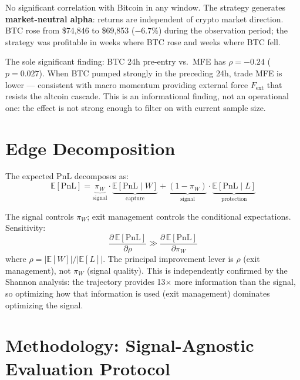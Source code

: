 \documentclass[11pt,a4paper]{article}
\newcommand{\E}{\mathbb{E}}
\newcommand{\Fext}{F_{\mathrm{ext}}}
\begin{document}
No significant correlation with Bitcoin in any window. The strategy generates \textbf{market-neutral alpha}: returns are independent of crypto market direction. BTC rose from \$74,846 to \$69,853 ($-6.7\%$) during the observation period; the strategy was profitable in weeks where BTC rose and weeks where BTC fell.

The sole significant finding: BTC 24h pre-entry vs.\ MFE has $\rho = -0.24$ ($p = 0.027$). When BTC pumped strongly in the preceding 24h, trade MFE is lower --- consistent with macro momentum providing external force $\Fext$ that resists the altcoin cascade. This is an informational finding, not an operational one: the effect is not strong enough to filter on with current sample size.


\section{Edge Decomposition}
\label{sec:edge}

The expected PnL decomposes as:
\begin{equation}
\E[\text{PnL}] = \underbrace{\pi_W}_{\text{signal}} \cdot \underbrace{\E[\text{PnL} \mid W]}_{\text{capture}} + \underbrace{(1-\pi_W)}_{\text{signal}} \cdot \underbrace{\E[\text{PnL} \mid L]}_{\text{protection}}
\end{equation}

The signal controls $\pi_W$; exit management controls the conditional expectations. Sensitivity:
\begin{equation}
\frac{\partial\,\E[\text{PnL}]}{\partial \rho} \gg \frac{\partial\,\E[\text{PnL}]}{\partial \pi_W}
\end{equation}
where $\rho = |\E[W]|/|\E[L]|$. The principal improvement lever is $\rho$ (exit management), not $\pi_W$ (signal quality). This is independently confirmed by the Shannon analysis: the trajectory provides 13$\times$ more information than the signal, so optimizing how that information is used (exit management) dominates optimizing the signal.


\section{Methodology: Signal-Agnostic Evaluation Protocol}
\label{sec:methodology}
\end{document}

